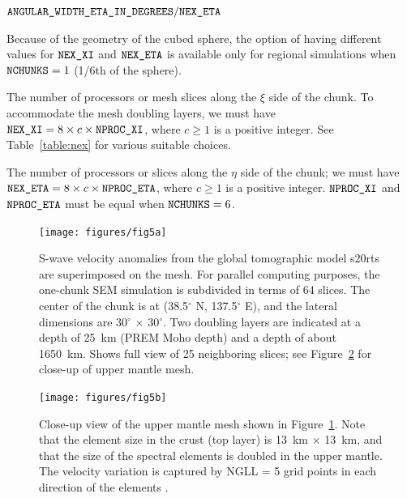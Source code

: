 \documentclass[oneside,english]{book}
\newenvironment{lyxcode}
{\begin{list}{}{
\setlength{\rightmargin}{\leftmargin}
\setlength{\listparindent}{0pt}%
\raggedright
\setlength{\itemsep}{0pt}
\setlength{\parsep}{0pt}
\normalfont\ttfamily}%
 \item[]}
{\end{list}}
\newcommand{\nexxi}{\mbox{\texttt{NEX\_XI}}}
\newcommand{\nexeta}{\mbox{\texttt{NEX\_ETA}}}
\newcommand{\nprocxi}{\mbox{\texttt{NPROC\_XI}}}
\newcommand{\nproceta}{\mbox{\texttt{NPROC\_ETA}}}
\newcommand{\nchunks}{\mbox{\texttt{NCHUNKS}}}
\begin{document}
\begin{description}
\begin{lyxcode}
$\texttt{ANGULAR\_WIDTH\_ETA\_IN\_DEGREES}/\nexeta$~
\end{lyxcode}
Because of the geometry of the cubed sphere, the option of having
different values for $\nexxi$ and $\nexeta$ is available only for
regional simulations when $\nchunks=1$ (1/6th of the sphere).

\item [{$\nprocxi$}] The number of processors or mesh slices along the
$\xi$ side of the chunk. To accommodate the mesh doubling layers,
we must have $\nexxi=8\times c\times\nprocxi$, where $c\ge1$ is
a positive integer. See Table~\ref{table:nex} for various suitable
choices.
\item [{$\nproceta$}] The number of processors or slices along the $\eta$
side of the chunk; we must have $\nexeta=8\times c\times\nproceta$,
where $c\ge1$ is a positive integer. $\nprocxi$ and $\nproceta$
must be equal when $\nchunks=6$.
\end{description}
%
\begin{figure}[H]
\begin{centering}
\texttt{[image: figures/fig5a]}
\par\end{centering}

\caption{\textbf{\label{fig:3D-spectral-element-mesh}}S-wave velocity anomalies
from the global tomographic model s20rts \citep{RiVa00} are superimposed
on the mesh. For parallel computing purposes, the one-chunk SEM simulation
is subdivided in terms of 64 slices. The center of the chunk is at
(38.5$^{\circ}$ N, 137.5$^{\circ}$ E), and the lateral dimensions
are 30$^{\circ}$ $\times$ 30$^{\circ}$. Two doubling layers are
indicated at a depth of 25~km (PREM Moho depth) and a depth of about
1650~km. Shows full view of 25 neighboring slices; see Figure~\ref{fig:Close-up-view-of}
for close-up of upper mantle mesh.}

\end{figure}
%
\begin{figure}[H]
\begin{centering}
\texttt{[image: figures/fig5b]}
\par\end{centering}

\caption{\textbf{\label{fig:Close-up-view-of}}Close-up view of the upper mantle
mesh shown in Figure~\ref{fig:3D-spectral-element-mesh}. Note that
the element size in the crust (top layer) is 13~km $\times$ 13~km,
and that the size of the spectral elements is doubled in the upper
mantle. The velocity variation is captured by NGLL = 5 grid points
in each direction of the elements \citep{KoTr02a,KoTr02b}.}

\end{figure}
\end{document}
